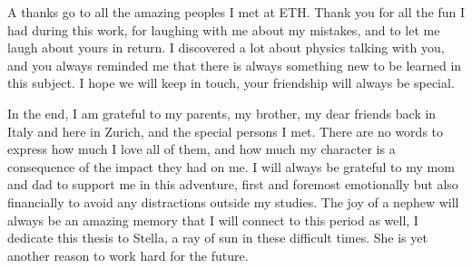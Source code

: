 A thanks go to all the amazing peoples I met at ETH. Thank you for all the fun I had during this work, for laughing with me about my mistakes, and to let me laugh about yours in return. I discovered a lot about physics talking with you, and you always reminded me that there is always something new to be learned in this subject. I hope we will keep in touch, your friendship will always be special.

In the end, I am grateful to my parents, my brother, my dear friends back in Italy and here in Zurich, and the special persons I met. There are no words to express how much I love all of them, and how much my character is a consequence of the impact they had on me. I will always be grateful to my mom and dad to support me in this adventure, first and foremost emotionally but also financially to avoid any distractions outside my studies. The joy of a nephew will always be an amazing memory that I will connect to this period as well, I dedicate this thesis to Stella, a ray of sun in these difficult times. She is yet another reason to work hard for the future.